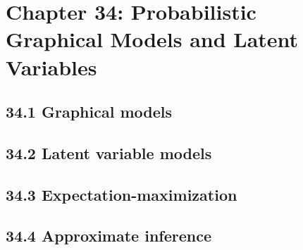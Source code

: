 \section{Chapter 34: Probabilistic Graphical Models and Latent Variables}

\subsection{34.1 Graphical models}

\subsection{34.2 Latent variable models}

\subsection{34.3 Expectation-maximization}

\subsection{34.4 Approximate inference}

\clearpage
